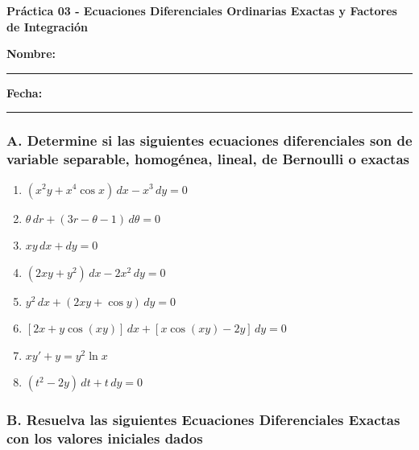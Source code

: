 \documentclass[a4paper,12pt]{article}
\begin{document}
\begin{center}
    \Large\textbf{Práctica 03 - Ecuaciones Diferenciales Ordinarias Exactas y Factores de Integración}\\[1cm]  

\end{center}
  \textbf{Nombre:} \rule{9cm}{0.4pt}  \textbf{Fecha:} \rule{4.5cm}{0.4pt}


\subsubsection*{A. Determine si las siguientes ecuaciones diferenciales son de variable separable, homogénea, lineal, de Bernoulli o exactas}

\begin{enumerate}
    \item \((x^2 y + x^4 \cos x) \, dx - x^3 \, dy = 0\)
    \item \(\theta \, dr + (3r - \theta - 1) \, d\theta = 0\)
    \item \(x y \, dx + dy = 0\)
    \item \((2xy + y^2)\, dx - 2x^2\, dy = 0\)
    \item \(y^2 \, dx + (2xy + \cos y) \, dy = 0\)
    \item \([2x + y \cos(xy)] \, dx + [x \cos(xy) - 2y] \, dy = 0\)
    \item \(x y' + y = y^2 \ln x\)
    \item \((t^2 - 2y)\, dt + t\, dy = 0\)
\end{enumerate}

\subsubsection*{B. Resuelva las siguientes Ecuaciones Diferenciales Exactas con los valores iniciales dados}
\end{document}
